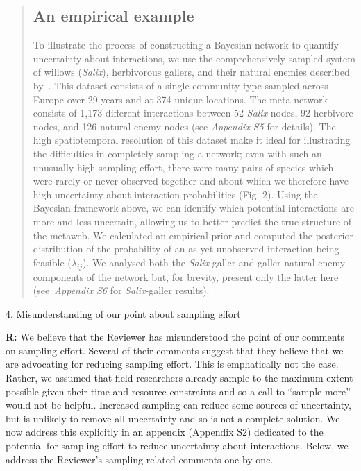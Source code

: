 \documentclass[12pt]{letter}
\begin{document}
		\begin{quotation}
		  \subsection*{An empirical example}

		      To illustrate the process of constructing a Bayesian network to quantify uncertainty about interactions, we use the comprehensively-sampled system of willows (\emph{Salix}), herbivorous gallers, and their natural enemies described by~\citet{Kopelke2017}. This dataset consists of a single community type sampled across Europe over 29 years and at 374 unique locations. The meta-network consists of 1,173 different interactions between 52 \emph{Salix} nodes, 92 herbivore nodes, and 126 natural enemy nodes (see \emph{Appendix S5} for details). 
		      The high spatiotemporal resolution of this dataset make it ideal for illustrating the difficulties in completely sampling a network; even with such an unusually high sampling effort, there were many pairs of species which were rarely or never observed together and about which we therefore have high uncertainty about interaction probabilities (Fig. 2). Using the Bayesian framework above, we can identify which potential interactions are more and less uncertain, allowing us to better predict the true structure of the metaweb. 
		      We calculated an empirical prior and computed the posterior distribution of the probability of an as-yet-unobserved interaction being feasible ($\lambda_{ij}$). We analysed both the \emph{Salix}-galler and galler-natural enemy components of the network but, for brevity, present only the latter here (see~\emph{Appendix S6} for \emph{Salix}-galler results).
		\end{quotation}


	4. Misunderstanding of our point about sampling effort 


		\textbf{R:} We believe that the Reviewer has  misunderstood the point of our comments on sampling effort. Several of their comments suggest that they believe that we are advocating for reducing sampling effort. This is emphatically not the case. Rather, we assumed that field researchers already sample to the maximum extent possible given their time and resource constraints and so a call to ``sample more'' would not be helpful. Increased sampling can reduce some sources of uncertainty, but is unlikely to remove all uncertainty and so is not a complete solution. We now address this explicitly in an appendix (Appendix S2)  dedicated to the potential for sampling effort to reduce uncertainty about interactions. Below, we address the Reviewer's sampling-related comments one by one.
\end{document}

